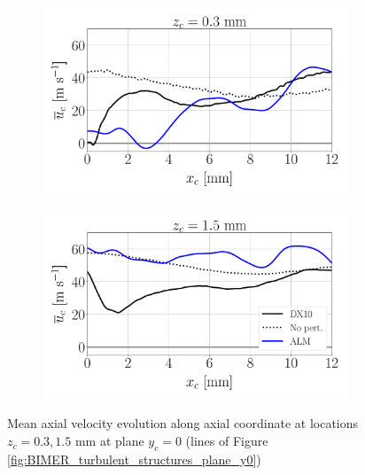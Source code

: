 \begin{figure}[ht]
\flushleft
\begin{subfigure}[b]{0.45\textwidth}
	\flushleft
   \includegraphics[scale=0.25]{./part3_applications/figures_ch9_lagrangian/gas_field_initial_conditions/line_y0_along_x_zlow}
\end{subfigure}
\hspace{0.4in}
\begin{subfigure}[b]{0.45\textwidth}
	\flushleft
   \includegraphics[scale=0.25]{./part3_applications/figures_ch9_lagrangian/gas_field_initial_conditions/line_y0_along_x_zhigh}
\end{subfigure}
\caption{Mean axial velocity evolution along axial coordinate at locations $z_c = 0.3, 1.5$ mm at plane $y_c = 0$ (lines of Figure \ref{fig:BIMER_turbulent_structures_plane_y0})}
\label{fig:BIMER_LGS_lines_y0_along_x_ux_mean}
\end{figure}


